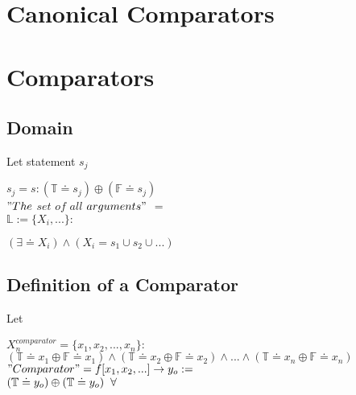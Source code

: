 \documentclass[11pt]{article}
\begin{document}
\section*{Canonical Comparators}




\section{Comparators}




\subsection{Domain}
\vspace{1mm}
Let statement $s_j$
\begin{center}
$
s_j = s : (\mathbb{T} \doteq s_j) \oplus  (\mathbb{F} \doteq s_j)
$
\\ \vspace{6mm}
$
"The$ $set$ $of$ $all$ $arguments"$ $=
$
\\ \vspace{3mm}
$
\mathbb{L}:= \{X_i,...\} :
$
\end{center}
\begin{center}
$
(\exists \doteq X_i) \land (X_i = s_1 \cup s_2 \cup ...)
$
\end{center}



\subsection{Definition of a Comparator}
\vspace{1mm}
Let
\begin{center}
$
X_n^{comparator} = \{x_1,x_2,...,x_n\} :
$
\\ \vspace{2mm}
$
(\mathbb{T} \doteq x_1 \oplus \mathbb{F} \doteq x_1) \land (\mathbb{T} \doteq x_2 \oplus \mathbb{F} \doteq x_2) \land ...\land (\mathbb{T} \doteq x_n \oplus \mathbb{F} \doteq x_n) 
$
\\ \vspace{6mm}
$
"Comparator" = f[x_1,x_2,...] \rightarrow y_o :=
$
\\ \vspace{2mm}
$
(\mathbb{T} \doteq y_o) \oplus  (\mathbb{T} \doteq y_o) \hspace{2mm} \forall 
$
\end{center}


\end{document}
